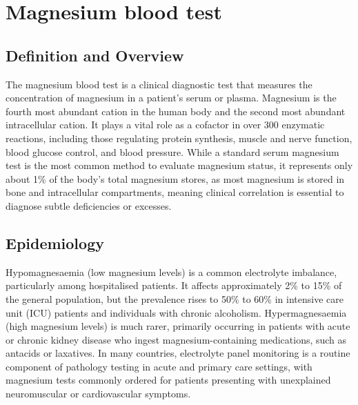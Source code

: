 \chapter{Magnesium blood test}

\section*{Definition and Overview}
The magnesium blood test is a clinical diagnostic test that measures the concentration of magnesium in a patient's serum or plasma. Magnesium is the fourth most abundant cation in the human body and the second most abundant intracellular cation. It plays a vital role as a cofactor in over 300 enzymatic reactions, including those regulating protein synthesis, muscle and nerve function, blood glucose control, and blood pressure. While a standard serum magnesium test is the most common method to evaluate magnesium status, it represents only about 1\% of the body's total magnesium stores, as most magnesium is stored in bone and intracellular compartments, meaning clinical correlation is essential to diagnose subtle deficiencies or excesses.

\section*{Epidemiology}
Hypomagnesaemia (low magnesium levels) is a common electrolyte imbalance, particularly among hospitalised patients. It affects approximately 2\% to 15\% of the general population, but the prevalence rises to 50\% to 60\% in intensive care unit (ICU) patients and individuals with chronic alcoholism. Hypermagnesaemia (high magnesium levels) is much rarer, primarily occurring in patients with acute or chronic kidney disease who ingest magnesium-containing medications, such as antacids or laxatives. In many countries, electrolyte panel monitoring is a routine component of pathology testing in acute and primary care settings, with magnesium tests commonly ordered for patients presenting with unexplained neuromuscular or cardiovascular symptoms.

